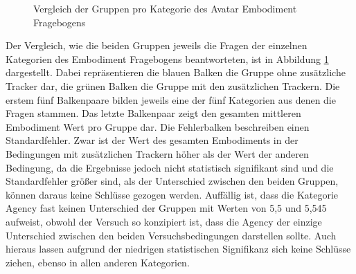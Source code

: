 \begin{figure}[h]
  \caption[Avatar Embodiment Durchschnitte pro Kategorie]{Vergleich der Gruppen pro Kategorie des Avatar Embodiment Fragebogens}
  \label{fig:TotalEmbodiment-Kategorien}
\end{figure}

Der Vergleich, wie die beiden Gruppen jeweils die Fragen der einzelnen Kategorien des Embodiment Fragebogens beantworteten, ist in Abbildung \ref{fig:TotalEmbodiment-Kategorien} dargestellt. Dabei repräsentieren die blauen Balken die Gruppe ohne zusätzliche Tracker dar, die grünen Balken die Gruppe mit den zusätzlichen Trackern. Die erstem fünf Balkenpaare bilden jeweils eine der fünf Kategorien aus denen die Fragen stammen. Das letzte Balkenpaar zeigt den gesamten mittleren Embodiment Wert pro Gruppe dar. Die Fehlerbalken beschreiben einen Standardfehler.
Zwar ist der Wert des gesamten Embodiments in der Bedingungen mit zusätzlichen Trackern höher als der Wert der anderen Bedingung, da die Ergebnisse jedoch nicht statistisch signifikant sind und die Standardfehler größer sind, als der Unterschied zwischen den beiden Gruppen, können daraus keine Schlüsse gezogen werden. Auffällig ist, dass die Kategorie Agency fast keinen Unterschied der Gruppen mit Werten von 5,5 und 5,545 aufweist, obwohl der Versuch so konzipiert ist, dass die Agency der einzige Unterschied zwischen den beiden Versuchsbedingungen darstellen sollte. Auch hieraus lassen aufgrund der niedrigen statistischen Signifikanz sich keine Schlüsse ziehen, ebenso in allen anderen Kategorien.


